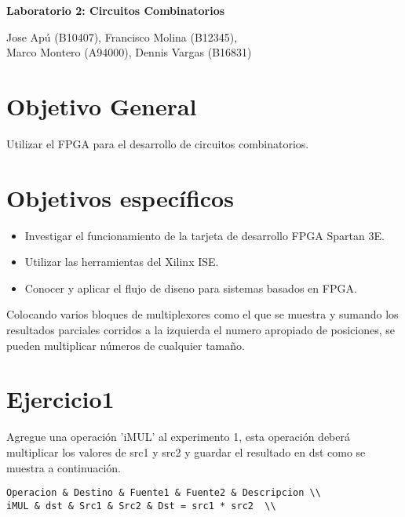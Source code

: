 \documentclass[10pt]{article}
\begin{document}
\begin{huge}
\begin{center}
\textbf{Laboratorio 2: Circuitos Combinatorios}
\end{center}
\end{huge}

\begin{Large}
\begin{center}
Jose Apú (B10407), Francisco Molina (B12345), \\Marco Montero (A94000), Dennis Vargas (B16831)
\end{center}
\end{Large}


\section*{Objetivo General}
Utilizar el FPGA para el desarrollo de circuitos combinatorios.

\section*{Objetivos específicos}
\begin{itemize}
\item Investigar el funcionamiento de la tarjeta de desarrollo FPGA Spartan 3E.
\item Utilizar las herramientas del Xilinx ISE.
\item Conocer y aplicar el flujo de diseno para sistemas basados en FPGA.
\end{itemize}
Colocando varios bloques de multiplexores como el que se muestra y sumando los resultados parciales corridos a la izquierda el numero apropiado de posiciones, se pueden multiplicar números de cualquier tamaño.

\newpage

\section*{Ejercicio1}
 Agregue una operación 'iMUL' al experimento 1, esta operación deberá multiplicar los valores de src1 y src2 y guardar el resultado en dst como se muestra a continuación.
\begin{lstlisting}
Operacion & Destino & Fuente1 & Fuente2 & Descripcion \\
iMUL & dst & Src1 & Src2 & Dst = src1 * src2  \\
\end{lstlisting}
\end{document}
